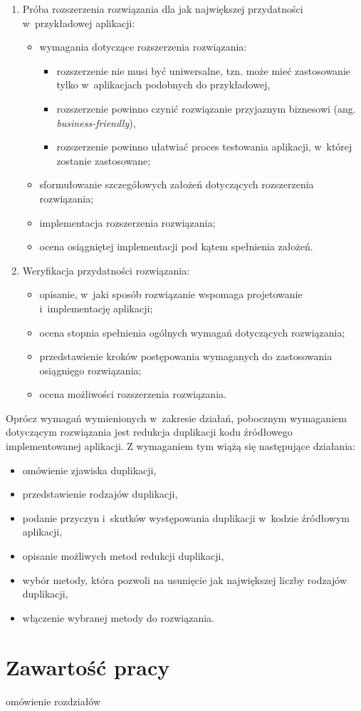 \begin{enumerate}
 \item Próba rozszerzenia rozwiązania dla jak największej przydatności w~przykładowej aplikacji:
  \begin{itemize}
   \item wymagania dotyczące rozszerzenia rozwiązania:
    \begin{itemize}
     \item rozszerzenie nie musi być uniwersalne, tzn. może mieć zastosowanie tylko w~aplikacjach podobnych do przykładowej,
     \item rozszerzenie powinno czynić rozwiązanie przyjaznym biznesowi (ang. \emph{business-friendly}),
     \item rozszerzenie powinno ułatwiać proces testowania aplikacji, w~której zostanie zastosowane;
    \end{itemize}
   \item sformułowanie szczegółowych założeń dotyczących rozszerzenia rozwiązania;
   \item implementacja rozszerzenia rozwiązania;
   \item ocena osiągniętej implementacji pod kątem spełnienia założeń.
  \end{itemize}
 
 \item Weryfikacja przydatności rozwiązania:
  \begin{itemize}
   \item opisanie, w~jaki sposób rozwiązanie wspomaga projetowanie i~implementację aplikacji;
   \item ocena stopnia spełnienia ogólnych wymagań dotyczących rozwiązania;
   \item przedstawienie kroków postępowania wymaganych do zastosowania osiągnięgo rozwiązania;
   \item ocena możliwości rozszerzenia rozwiązania.
  \end{itemize}

\end{enumerate}

Oprócz wymagań wymienionych w~zakresie działań, pobocznym wymaganiem dotyczącym rozwiązania jest redukcja duplikacji kodu źródłowego implementowanej aplikacji.
Z wymaganiem tym wiążą się następujące działania:

\begin{itemize}
 \item omówienie zjawiska duplikacji,
 \item przedstawienie rodzajów duplikacji,
 \item podanie przyczyn i~skutków występowania duplikacji w~kodzie źródłowym aplikacji,
 \item opisanie możliwych metod redukcji duplikacji,
 \item wybór metody, która pozwoli na usunięcie jak największej liczby rodzajów duplikacji,
 \item włączenie wybranej metody do rozwiązania.
\end{itemize}



\section{Zawartość pracy}

omówienie rozdziałów
